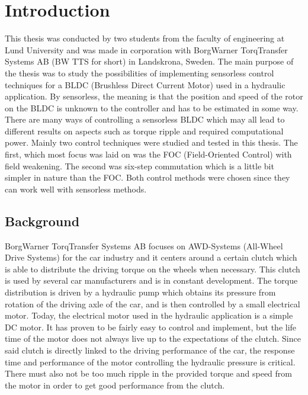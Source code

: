 \documentclass{LTHthesis}
\begin{document}
\chapter{Introduction}


This thesis was conducted by two students from the faculty of engineering at Lund University and was made in corporation with BorgWarner TorqTransfer Systems AB (BW TTS for short) in Landskrona, Sweden. The main purpose of the thesis was to study the possibilities of implementing sensorless control techniques for a BLDC (Brushless Direct Current Motor) used in a hydraulic application. By sensorless, the meaning is that the position and speed of the rotor on the BLDC is unknown to the controller and has to be estimated in some way.
There are many ways of controlling a sensorless BLDC which may all lead to different results on aspects such as torque ripple and required computational power. Mainly two control techniques were studied and tested in this thesis. The first, which most focus was laid on was the FOC (Field-Oriented Control) with field weakening. The second was six-step commutation which is a little bit simpler in nature than the FOC. Both control methods were chosen since they can work well with sensorless methods.
\section{Background}
BorgWarner TorqTransfer Systems AB focuses on AWD-Systems (All-Wheel Drive Systems) for the car industry and it centers around a certain clutch which is able to distribute the driving torque on the wheels when necessary. This clutch is used by several car manufacturers and is in constant development. The torque distribution is driven by a hydraulic pump which obtains its pressure from rotation of the driving axle of the car, and is then controlled by a small electrical motor. Today, the electrical motor used in the hydraulic application is a simple DC motor. It has proven to be fairly easy to control and implement, but the life time of the motor does not always live up to the expectations of the clutch. Since said clutch is directly linked to the driving performance of the car, the response time and performance of the motor  controlling the hydraulic pressure is critical. There must also not be too much ripple in the provided torque and speed from the motor in order to get good performance from the clutch.
\end{document}
